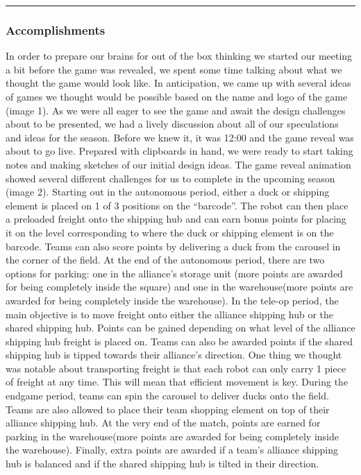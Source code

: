 \noindent\hfil\rule{\textwidth}{.4pt}\hfil

\subsubsection*{Accomplishments}
In order to prepare our brains for out of the box thinking we started our meeting a bit before the game was revealed, we spent some time talking about what we thought the game would look like. In anticipation, we came up with several ideas of games we thought would be possible based on the name and logo of the game (image 1). As we were all eager to see the game and await the design challenges about to be presented, we had a lively discussion about all of our speculations and ideas for the season. Before we knew it, it was 12:00 and the game reveal was about to go live. Prepared with clipboards in hand, we were ready to start taking notes and making sketches of our initial design ideas.
The game reveal animation showed several different challenges for us to complete in the upcoming season (image 2). Starting out in the autonomous period, either a duck or shipping element is placed on 1 of 3 positions on the “barcode”. The robot can then place a preloaded freight onto the shipping hub and can earn bonus points for placing it on the level corresponding to where the duck or shipping element is on the barcode. Teams can also score points by delivering a duck from the carousel in the corner of the field. At the end of the autonomous period, there are two options for parking: one in the alliance’s storage unit (more points are awarded for being completely inside the square) and one in the warehouse(more points are awarded for being completely inside the warehouse).
In the tele-op period, the main objective is to move freight onto either the alliance shipping hub or the shared shipping hub. Points can be gained depending on what level of the alliance shipping hub freight is placed on. Teams can also be awarded points if the shared shipping hub is tipped towards their alliance’s direction. One thing we thought was notable about transporting freight is that each robot can only carry 1 piece of freight at any time. This will mean that efficient movement is key.
During the endgame period, teams can spin the carousel to deliver ducks onto the field. Teams are also allowed to place their team shopping element on top of their alliance shipping hub. At the very end of the match, points are earned for parking in the warehouse(more points are awarded for being completely inside the warehouse). Finally, extra points are awarded if a team’s alliance shipping hub is balanced and if the shared shipping hub is tilted in their direction.
